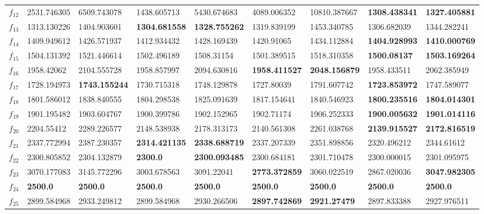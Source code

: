 \begin{table*}[t!]
\begin{tabular}{|p{0.8cm}|p{1.6cm}|p{1.6cm}|p{1.6cm}|p{1.6cm}|p{1.6cm}|p{1.6cm}|p{1.6cm}|p{1.6cm}|}
$f_{12}$  & 2531.746305 & 6509.743078 & 1438.605713 & 5430.674683 & 4089.006352 & 10810.387667 & \textbf{1308.438341} & \textbf{1327.405881} \\ 
$f_{13}$ & 1313.130226 & 1404.903601 & \textbf{1304.681558} & \textbf{1328.755262} & 1319.839199 & 1453.340785 & 1306.682039 & 1344.282241 \\ 
$f_{14}$  & 1409.949612 & 1426.571937 & 1412.934432 & 1428.169439 & 1420.91065 & 1434.112884 & \textbf{1404.928993} & \textbf{1410.000769} \\ 
$f_{15}$  & 1504.131392 & 1521.446614 & 1502.496189 & 1508.31154 & 1501.389515 & 1518.310358 & \textbf{1500.08137} & \textbf{1503.169264} \\ 
$f_{16}$  & 1958.42062 & 2104.555728 & 1958.857997 & 2094.630816 & \textbf{1958.411527} & \textbf{2048.156879} & 1958.433511 & 2062.385949 \\ 
$f_{17}$  & 1728.194973 & \textbf{1743.155244} & 1730.715318 & 1748.129878 & 1727.80039 & 1791.607742 & \textbf{1723.853972} & 1747.589077 \\ 
$f_{18}$  & 1801.586012 & 1838.840555 & 1804.298538 & 1825.091639 & 1817.154641 & 1840.546923 & \textbf{1800.235516} & \textbf{1804.014301} \\ 
$f_{19}$  & 1901.195482 & 1903.604767 & 1900.399786 & 1902.152965 & 1902.71174 & 1906.252333 & \textbf{1900.005632} & \textbf{1901.014116} \\ 
$f_{20}$  & 2204.55412 & 2289.226577 & 2148.538938 & 2178.313173 & 2140.561308 & 2261.038768 & \textbf{2139.915527} & \textbf{2172.816519} \\ 
$f_{21}$  & 2337.772994 & 2387.230357 & \textbf{2314.421135} & \textbf{2338.688719} & 2337.207339 & 2351.898856 & 2320.496212 & 2344.61612 \\ 
$f_{22}$  & 2300.805852 & 2304.132879 & \textbf{2300.0} & \textbf{2300.093485} & 2300.684181 & 2301.710478 & 2300.000015 & 2301.095975 \\ 
$f_{23}$  & 3070.177083 & 3145.772296 & 3003.678563 & 3091.22041 & \textbf{2773.372859} & 3060.022519 & 2867.020036 & \textbf{3047.982305} \\ 
$f_{24}$  & \textbf{2500.0} & \textbf{2500.0} & \textbf{2500.0} & \textbf{2500.0} & \textbf{2500.0} & \textbf{2500.0} & \textbf{2500.0} & \textbf{2500.0} \\ 
$f_{25}$  & 2899.584968 & 2933.249812 & 2899.584968 & 2930.266506 & \textbf{2897.742869} & \textbf{2921.27479} & 2897.833388 & 2927.976511 \\ 

\end{tabular}
\end{table*}

